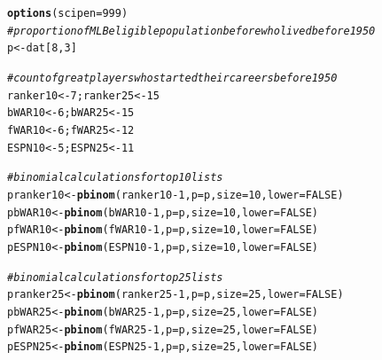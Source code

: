 \documentclass[11pt]{article}\usepackage[]{graphicx}\usepackage[]{color}
\makeatletter
\newcommand{\hlnum}[1]{\textcolor[rgb]{0.686,0.059,0.569}{#1}}%
\newcommand{\hlcom}[1]{\textcolor[rgb]{0.678,0.584,0.686}{\textit{#1}}}%
\newcommand{\hlopt}[1]{\textcolor[rgb]{0,0,0}{#1}}%
\newcommand{\hlstd}[1]{\textcolor[rgb]{0.345,0.345,0.345}{#1}}%
\newcommand{\hlkwb}[1]{\textcolor[rgb]{0.69,0.353,0.396}{#1}}%
\newcommand{\hlkwc}[1]{\textcolor[rgb]{0.333,0.667,0.333}{#1}}%
\newcommand{\hlkwd}[1]{\textcolor[rgb]{0.737,0.353,0.396}{\textbf{#1}}}%
\newenvironment{kframe}{%
 \def\at@end@of@kframe{}%
 \ifinner\ifhmode%
  \def\at@end@of@kframe{\end{minipage}}%
  \begin{minipage}{\columnwidth}%
 \fi\fi%
 \def\FrameCommand##1{\hskip\@totalleftmargin \hskip-\fboxsep
 \colorbox{shadecolor}{##1}\hskip-\fboxsep
     \hskip-\linewidth \hskip-\@totalleftmargin \hskip\columnwidth}%
 \MakeFramed {\advance\hsize-\width
   \@totalleftmargin\z@ \linewidth\hsize
   \@setminipage}}%
 {\par\unskip\endMakeFramed%
 \at@end@of@kframe}
\newenvironment{knitrout}{}{} %
\makeatother
\begin{document}
\begin{knitrout}
\color{fgcolor}\begin{kframe}
\begin{alltt}
\hlkwd{options}\hlstd{(}\hlkwc{scipen}\hlstd{=}\hlnum{999}\hlstd{)}
\hlcom{# proportion of MLB eligible population before who lived before 1950}
\hlstd{p} \hlkwb{<-} \hlstd{dat[}\hlnum{8}\hlstd{,} \hlnum{3}\hlstd{]}

\hlcom{# count of great players who started their careers before 1950}
\hlstd{ranker10} \hlkwb{<-} \hlnum{7}\hlstd{; ranker25} \hlkwb{<-} \hlnum{15}
\hlstd{bWAR10} \hlkwb{<-} \hlnum{6}\hlstd{;   bWAR25} \hlkwb{<-} \hlnum{15}
\hlstd{fWAR10} \hlkwb{<-} \hlnum{6}\hlstd{;   fWAR25} \hlkwb{<-} \hlnum{12}
\hlstd{ESPN10} \hlkwb{<-} \hlnum{5}\hlstd{;   ESPN25} \hlkwb{<-} \hlnum{11}

\hlcom{# binomial calculations for top 10 lists}
\hlstd{pranker10} \hlkwb{<-} \hlkwd{pbinom}\hlstd{(ranker10} \hlopt{-} \hlnum{1}\hlstd{,} \hlkwc{p} \hlstd{= p,} \hlkwc{size} \hlstd{=} \hlnum{10}\hlstd{,} \hlkwc{lower} \hlstd{=} \hlnum{FALSE}\hlstd{)}
\hlstd{pbWAR10}   \hlkwb{<-} \hlkwd{pbinom}\hlstd{(bWAR10} \hlopt{-} \hlnum{1}\hlstd{,} \hlkwc{p} \hlstd{= p,} \hlkwc{size} \hlstd{=} \hlnum{10}\hlstd{,} \hlkwc{lower} \hlstd{=} \hlnum{FALSE}\hlstd{)}
\hlstd{pfWAR10}   \hlkwb{<-} \hlkwd{pbinom}\hlstd{(fWAR10} \hlopt{-} \hlnum{1}\hlstd{,} \hlkwc{p} \hlstd{= p,} \hlkwc{size} \hlstd{=} \hlnum{10}\hlstd{,} \hlkwc{lower} \hlstd{=} \hlnum{FALSE}\hlstd{)}
\hlstd{pESPN10}   \hlkwb{<-} \hlkwd{pbinom}\hlstd{(ESPN10} \hlopt{-} \hlnum{1}\hlstd{,} \hlkwc{p} \hlstd{= p,} \hlkwc{size} \hlstd{=} \hlnum{10}\hlstd{,} \hlkwc{lower} \hlstd{=} \hlnum{FALSE}\hlstd{)}

\hlcom{# binomial calculations for top 25 lists}
\hlstd{pranker25} \hlkwb{<-} \hlkwd{pbinom}\hlstd{(ranker25} \hlopt{-} \hlnum{1}\hlstd{,} \hlkwc{p} \hlstd{= p,} \hlkwc{size} \hlstd{=} \hlnum{25}\hlstd{,} \hlkwc{lower} \hlstd{=} \hlnum{FALSE}\hlstd{)}
\hlstd{pbWAR25}   \hlkwb{<-} \hlkwd{pbinom}\hlstd{(bWAR25} \hlopt{-} \hlnum{1}\hlstd{,} \hlkwc{p} \hlstd{= p,} \hlkwc{size} \hlstd{=} \hlnum{25}\hlstd{,} \hlkwc{lower} \hlstd{=} \hlnum{FALSE}\hlstd{)}
\hlstd{pfWAR25}   \hlkwb{<-} \hlkwd{pbinom}\hlstd{(fWAR25} \hlopt{-} \hlnum{1}\hlstd{,} \hlkwc{p} \hlstd{= p,} \hlkwc{size} \hlstd{=} \hlnum{25}\hlstd{,} \hlkwc{lower} \hlstd{=} \hlnum{FALSE}\hlstd{)}
\hlstd{pESPN25}   \hlkwb{<-} \hlkwd{pbinom}\hlstd{(ESPN25} \hlopt{-} \hlnum{1}\hlstd{,} \hlkwc{p} \hlstd{= p,} \hlkwc{size} \hlstd{=} \hlnum{25}\hlstd{,} \hlkwc{lower} \hlstd{=} \hlnum{FALSE}\hlstd{)}
\end{alltt}
\end{kframe}
\end{knitrout}
\end{document}

